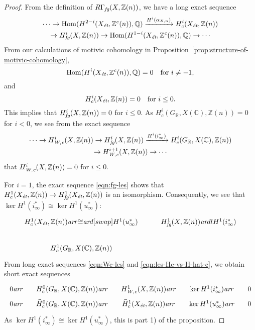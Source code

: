 \documentclass[draft]{article}
\DeclareMathOperator{\Hom}{Hom}
\newcommand{\CC}{\mathbb{C}}
\newcommand{\QQ}{\mathbb{Q}}
\newcommand{\RR}{\mathbb{R}}
\newcommand{\ZZ}{\mathbb{Z}}
\newcommand{\ar}{\text{\it ar}}
\newcommand{\et}{\text{\it \'{e}t}}
\newcommand{\fg}{\text{\it fg}}
\newcommand{\Wc}{\text{\it W,c}}
\theoremstyle{myplain}
\theoremstyle{mydefinition}
\numberwithin{equation}{section}
\begin{document}
\begin{proof}
  From the definition of $R\Gamma_\fg (X, \ZZ(n))$, we have a long exact
  sequence
  \begin{multline}
    \label{eqn:fg-les}
    \cdots \to \Hom (H^{2-i} (X_\et, \ZZ^c (n)), \QQ) \xrightarrow{H^i (\alpha_{X,n})} H^i_c (X_\et, \ZZ(n)) \\
    \to H^i_\fg (X, \ZZ(n)) \to \Hom (H^{1-i} (X_\et, \ZZ^c (n)), \QQ)
    \to \cdots
  \end{multline}
  From our calculations of motivic cohomology in
  Proposition~\ref{prop:structure-of-motivic-cohomology},
  $$\Hom (H^i (X_\et, \ZZ^c (n)), \QQ) = 0 \quad \text{for }i \ne -1,$$
  and
  $$H^i_c (X_\et, \ZZ(n)) = 0 \quad \text{for }i \le 0.$$
  This implies that $H^i_\fg (X, \ZZ(n)) = 0$ for $i \le 0$.
  As $H^i_c (G_\RR, X(\CC), \ZZ(n)) = 0$ for $i < 0$, we see from the exact
  sequence
  \begin{multline}
    \label{eqn:Wc-les}
    \cdots \to H^i_\Wc (X, \ZZ(n)) \to
    H^i_\fg (X,\ZZ(n)) \xrightarrow{H^i (i^*_\infty)}
    H^i_c (G_\RR, X(\CC), \ZZ(n)) \\
    \to H^{i+1}_\Wc (X, \ZZ(n)) \to \cdots
  \end{multline}
  that $H^i_\Wc (X, \ZZ(n)) = 0$ for $i \le 0$.

  \vspace{1em}

  For $i = 1$, the exact sequence \eqref{eqn:fg-les} shows that
  $H^1_c (X_\et, \ZZ(n)) \to H^1_\fg (X_\et, \ZZ(n))$ is an isomorphism.
  Consequently, we see that
  $\ker H^1 (i^*_\infty) \cong \ker H^1 (u_\infty^*)$:
  \[ \begin{tikzcd}
      H^1_c (X_\et, \ZZ(n)) \ar{r}{\cong}\ar{d}[swap]{H^1 (u^*_\infty)} & H^1_\fg (X, \ZZ(n)) \ar{dl}{H^1 (i^*_\infty)} \\
      H^1_c (G_\RR, X(\CC), \ZZ(n))
    \end{tikzcd} \]
  From long exact sequences \eqref{eqn:Wc-les} and
  \eqref{eqn:les-Hc-vs-H-hat-c}, we obtain short exact sequences
  \[ \begin{tikzcd}[column sep=1em,row sep=0pt]
      0 \ar{r} & H^0_c (G_\RR, X(\CC), \ZZ(n)) \ar{r} & H^1_\Wc (X, \ZZ(n)) \ar{r} & \ker H^1 (i^*_\infty) \ar{r} & 0 \\
      0 \ar{r} & \widehat{H}^0_c (G_\RR, X(\CC), \ZZ(n)) \ar{r} & \widehat{H}^1_c (X_\et, \ZZ(n)) \ar{r} & \ker H^1 (u_\infty^*) \ar{r} & 0
    \end{tikzcd} \]
  As $\ker H^1 (i^*_\infty) \cong \ker H^1 (u_\infty^*)$,
  this is part 1) of the proposition.


\end{proof}
\end{document}
